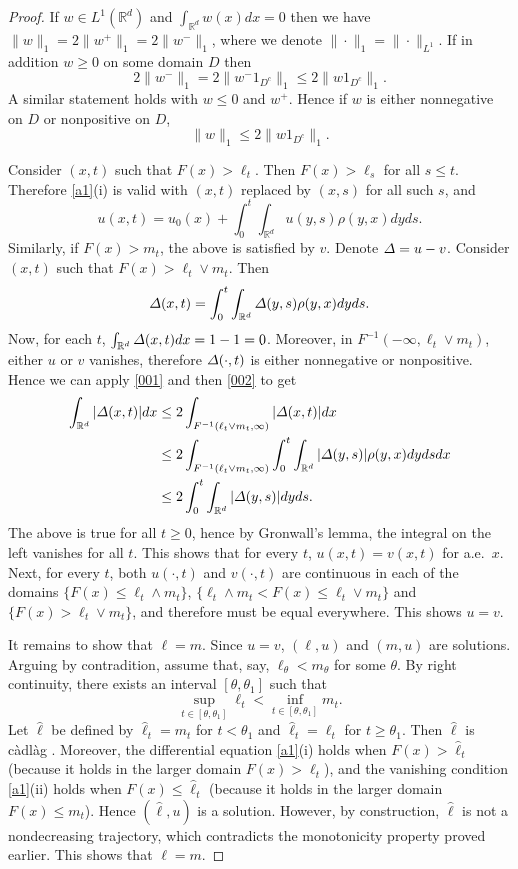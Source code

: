 \documentclass[11pt]{amsart}
\theoremstyle{plain}
\newcommand{\Del}{\mathnormal{\Delta}}
\newcommand{\R}{{\mathbb R}}
\newcommand{\w}{\wedge}
\newcommand{\iy}{\infty}
\newcommand{\cadlag}{c\`adl\`ag }
\newcommand{\F}{F}
\begin{document}
\begin{proof}
If $w\in L^1(\R^d)$ and $\int_{\R^d}w(x)dx=0$ then we have
$\|w\|_1=2\|w^+\|_1=2\|w^-\|_1$, where we denote $\|\cdot\|_1=\|\cdot\|_{L^1}$.
If in addition $w\ge 0$ on some domain $D$ then
\[
2\|w^-\|_1=2\|w^-1_{D^c}\|_1\le 2\|w1_{D^c}\|_1.
\]
A similar statement holds with $w\le0$ and $w^+$.
Hence if $w$ is either nonnegative on $D$ or nonpositive on $D$,
\begin{equation}\label{001}
\|w\|_1\le2\|w1_{D^c}\|_1.
\end{equation}

Consider $(x,t)$ such that $\F(x)>\ell_t$. Then $\F(x)>\ell_s$ for all $s\le t$.
Therefore \eqref{a1}(i) is valid with $(x,t)$ replaced by $(x,s)$ for all such $s$, and
\[
u(x,t)=u_0(x)+\int_0^t\int_{\R^d}u(y,s)\rho(y,x)dyds.
\]
Similarly, if $\F(x)>m_t$, the above is satisfied by $v$.
Denote $\Del=u-v$. Consider $(x,t)$ such that $\F(x)>\ell_t\vee m_t$. Then
\begin{equation}\label{002}
\Del(x,t)=\int_0^t\int_{\R^d}\Del(y,s)\rho(y,x)dyds.
\end{equation}
Now, for each $t$, $\int_{\R^d}\Del(x,t)dx=1-1=0$. Moreover, in
$\F^{-1}(-\iy,\ell_t\vee m_t)$, either $u$ or $v$ vanishes,
therefore $\Del(\cdot,t)$ is either nonnegative or nonpositive.
Hence we can apply \eqref{001} and then \eqref{002} to get
\begin{align*}
\int_{\R^d}|\Del(x,t)|dx
&\le2\int_{\F^{-1}(\ell_t\vee m_t,\iy)}|\Del(x,t)|dx
\\
&\le 2\int_{\F^{-1}(\ell_t\vee m_t,\iy)}\int_0^t\int_{\R^d}|\Del(y,s)|\rho(y,x)dydsdx
\\
&\le 2\int_0^t\int_{\R^d}|\Del(y,s)|dyds.
\end{align*}
The above is true for all $t\ge0$, hence by Gronwall's lemma,
the integral on the left vanishes for all $t$.
This shows that for every $t$, $u(x,t)=v(x,t)$ for
a.e.\ $x$. Next, for every $t$, both $u(\cdot,t)$ and $v(\cdot,t)$
are continuous in each of the domains
$\{F(x)\le\ell_t\w m_t\}$, $\{\ell_t\w m_t<F(x)\le\ell_t\vee m_t\}$
and $\{F(x)>\ell_t\vee m_t\}$,
and therefore must be equal everywhere. This shows $u=v$.

It remains to show that $\ell=m$. Since $u=v$,
$(\ell,u)$ and $(m,u)$ are solutions. Arguing by contradition,
assume that, say, $\ell_\theta<m_\theta$ for some $\theta$.
By right continuity, there exists an interval $[\theta,\theta_1]$ such that
\[
\sup_{t\in[\theta,\theta_1]}\ell_t < \inf_{t\in[\theta,\theta_1]}m_t.
\]
Let $\hat\ell$ be defined by $\hat\ell_t=m_t$ for $t<\theta_1$ and
$\hat\ell_t=\ell_t$ for $t\ge \theta_1$. Then $\hat\ell$ is \cadlag.
Moreover, the differential equation \eqref{a1}(i) holds when
$\F(x)>\hat\ell_t$ (because it holds in the larger domain $\F(x)>\ell_t$),
and the vanishing condition \eqref{a1}(ii) holds when $\F(x)\le\hat\ell_t$
(because it holds in the larger domain $\F(x)\le m_t$).
Hence $(\hat\ell,u)$ is a solution.
However, by construction, $\hat\ell$ is not a nondecreasing trajectory,
which contradicts the monotonicity property proved earlier.
This shows that $\ell=m$.
\end{proof}
\end{document}
